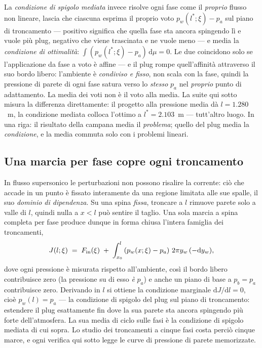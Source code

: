 La \emph{condizione di spigolo mediata} invece risolve ogni fase come
il \emph{proprio} flusso non lineare, lascia che ciascuna esprima il
proprio voto $p_w(l^{*};\xi) - p_a$ sul piano di troncamento ---
positivo significa che quella fase sta ancora spingendo lì e vuole
più plug, negativo che viene trascinata e ne vuole meno --- e media
la \emph{condizione di ottimalità}:
$\int (p_w(l^{*};\xi) - p_a)\,\mathrm{d}\mu = 0$. Le due coincidono
solo se l'applicazione da fase a voto è affine --- e il plug rompe
quell'affinità attraverso il suo bordo libero: l'ambiente è
\emph{condiviso e fisso}, non scala con la fase, quindi la pressione
di parete di ogni fase satura verso lo \emph{stesso} $p_a$ nel
\emph{proprio} punto di adattamento. La media dei voti non è il voto
alla media. La suite qui sotto misura la differenza direttamente: il
progetto alla pressione media dà $l = 1.280$~m, la condizione mediata
colloca l'ottimo a $l^{*} = 2.103$~m --- tutt'altro luogo. In una
riga: il risultato della campana media il \emph{problema}; quello del
plug media la \emph{condizione}, e la media commuta solo con i
problemi lineari.

\subsection{Una marcia per fase copre ogni troncamento}

In flusso supersonico le perturbazioni non possono risalire la
corrente: ciò che accade in un punto è fissato interamente da una
regione limitata alle sue spalle, il suo \emph{dominio di
dipendenza}. Su una spina \emph{fissa}, troncare a $l$ rimuove
parete solo a valle di $l$, quindi nulla a $x < l$ può sentire il
taglio. Una sola marcia a spina completa per fase produce dunque in
forma chiusa l'intera famiglia dei troncamenti,
\begin{equation}
J(l;\xi) \;=\; F_{\rm in}(\xi)
\;+\; \int_{x_0}^{l} \left(p_w(x;\xi) - p_a\right)
\,2\pi y_w\,(-\mathrm{d}y_w),
\label{eq:trunc}
\end{equation}
dove ogni pressione è misurata rispetto all'ambiente, così il bordo
libero contribuisce zero (la pressione su di esso \emph{è} $p_a$) e
anche un piano di base a $p_b = p_a$ contribuisce zero. Derivando in
$l$ si ottiene la condizione marginale $\mathrm{d}J/\mathrm{d}l = 0$,
cioè $p_w(l) = p_a$ --- la condizione di spigolo del plug sul piano
di troncamento: estendere il plug esattamente fin dove la sua parete
sta ancora spingendo più forte dell'atmosfera. La sua media di ciclo
sulle fasi è la condizione di spigolo mediata di cui sopra. Lo studio
dei troncamenti a cinque fasi costa perciò cinque marce, e ogni
verifica qui sotto legge le curve di pressione di parete
memorizzate.

